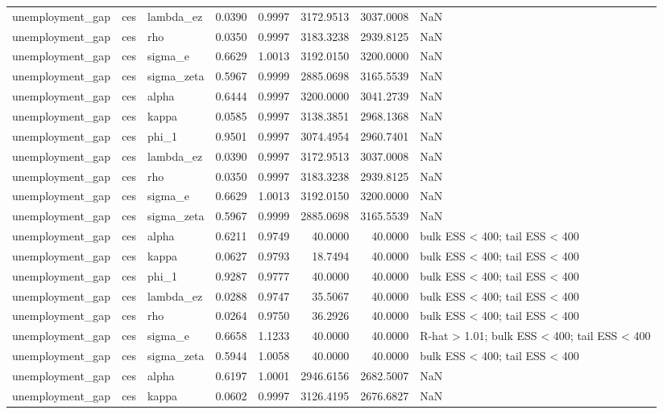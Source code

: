 \begin{tabular}{lllrrrrl}
unemployment\_gap & ces & lambda\_ez & 0.0390 & 0.9997 & 3172.9513 & 3037.0008 & NaN \\
unemployment\_gap & ces & rho & 0.0350 & 0.9997 & 3183.3238 & 2939.8125 & NaN \\
unemployment\_gap & ces & sigma\_e & 0.6629 & 1.0013 & 3192.0150 & 3200.0000 & NaN \\
unemployment\_gap & ces & sigma\_zeta & 0.5967 & 0.9999 & 2885.0698 & 3165.5539 & NaN \\
unemployment\_gap & ces & alpha & 0.6444 & 0.9997 & 3200.0000 & 3041.2739 & NaN \\
unemployment\_gap & ces & kappa & 0.0585 & 0.9997 & 3138.3851 & 2968.1368 & NaN \\
unemployment\_gap & ces & phi\_1 & 0.9501 & 0.9997 & 3074.4954 & 2960.7401 & NaN \\
unemployment\_gap & ces & lambda\_ez & 0.0390 & 0.9997 & 3172.9513 & 3037.0008 & NaN \\
unemployment\_gap & ces & rho & 0.0350 & 0.9997 & 3183.3238 & 2939.8125 & NaN \\
unemployment\_gap & ces & sigma\_e & 0.6629 & 1.0013 & 3192.0150 & 3200.0000 & NaN \\
unemployment\_gap & ces & sigma\_zeta & 0.5967 & 0.9999 & 2885.0698 & 3165.5539 & NaN \\
unemployment\_gap & ces & alpha & 0.6211 & 0.9749 & 40.0000 & 40.0000 & bulk ESS < 400; tail ESS < 400 \\
unemployment\_gap & ces & kappa & 0.0627 & 0.9793 & 18.7494 & 40.0000 & bulk ESS < 400; tail ESS < 400 \\
unemployment\_gap & ces & phi\_1 & 0.9287 & 0.9777 & 40.0000 & 40.0000 & bulk ESS < 400; tail ESS < 400 \\
unemployment\_gap & ces & lambda\_ez & 0.0288 & 0.9747 & 35.5067 & 40.0000 & bulk ESS < 400; tail ESS < 400 \\
unemployment\_gap & ces & rho & 0.0264 & 0.9750 & 36.2926 & 40.0000 & bulk ESS < 400; tail ESS < 400 \\
unemployment\_gap & ces & sigma\_e & 0.6658 & 1.1233 & 40.0000 & 40.0000 & R-hat > 1.01; bulk ESS < 400; tail ESS < 400 \\
unemployment\_gap & ces & sigma\_zeta & 0.5944 & 1.0058 & 40.0000 & 40.0000 & bulk ESS < 400; tail ESS < 400 \\
unemployment\_gap & ces & alpha & 0.6197 & 1.0001 & 2946.6156 & 2682.5007 & NaN \\
unemployment\_gap & ces & kappa & 0.0602 & 0.9997 & 3126.4195 & 2676.6827 & NaN \\

\end{tabular}
